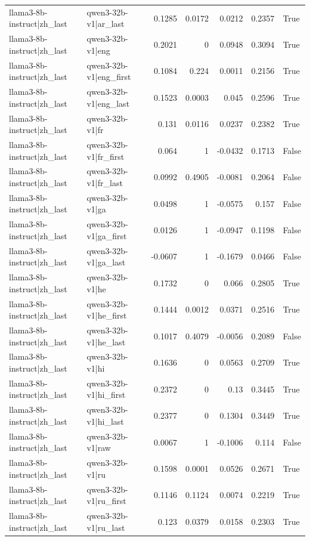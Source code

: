 \begin{table}
\begin{tabular}{l l r r r r l}
llama3-8b-instruct|zh_last & qwen3-32b-v1|ar_last & 0.1285 & 0.0172 & 0.0212 & 0.2357 & True \\
llama3-8b-instruct|zh_last & qwen3-32b-v1|eng & 0.2021 & 0 & 0.0948 & 0.3094 & True \\
llama3-8b-instruct|zh_last & qwen3-32b-v1|eng_first & 0.1084 & 0.224 & 0.0011 & 0.2156 & True \\
llama3-8b-instruct|zh_last & qwen3-32b-v1|eng_last & 0.1523 & 0.0003 & 0.045 & 0.2596 & True \\
llama3-8b-instruct|zh_last & qwen3-32b-v1|fr & 0.131 & 0.0116 & 0.0237 & 0.2382 & True \\
llama3-8b-instruct|zh_last & qwen3-32b-v1|fr_first & 0.064 & 1 & -0.0432 & 0.1713 & False \\
llama3-8b-instruct|zh_last & qwen3-32b-v1|fr_last & 0.0992 & 0.4905 & -0.0081 & 0.2064 & False \\
llama3-8b-instruct|zh_last & qwen3-32b-v1|ga & 0.0498 & 1 & -0.0575 & 0.157 & False \\
llama3-8b-instruct|zh_last & qwen3-32b-v1|ga_first & 0.0126 & 1 & -0.0947 & 0.1198 & False \\
llama3-8b-instruct|zh_last & qwen3-32b-v1|ga_last & -0.0607 & 1 & -0.1679 & 0.0466 & False \\
llama3-8b-instruct|zh_last & qwen3-32b-v1|he & 0.1732 & 0 & 0.066 & 0.2805 & True \\
llama3-8b-instruct|zh_last & qwen3-32b-v1|he_first & 0.1444 & 0.0012 & 0.0371 & 0.2516 & True \\
llama3-8b-instruct|zh_last & qwen3-32b-v1|he_last & 0.1017 & 0.4079 & -0.0056 & 0.2089 & False \\
llama3-8b-instruct|zh_last & qwen3-32b-v1|hi & 0.1636 & 0 & 0.0563 & 0.2709 & True \\
llama3-8b-instruct|zh_last & qwen3-32b-v1|hi_first & 0.2372 & 0 & 0.13 & 0.3445 & True \\
llama3-8b-instruct|zh_last & qwen3-32b-v1|hi_last & 0.2377 & 0 & 0.1304 & 0.3449 & True \\
llama3-8b-instruct|zh_last & qwen3-32b-v1|raw & 0.0067 & 1 & -0.1006 & 0.114 & False \\
llama3-8b-instruct|zh_last & qwen3-32b-v1|ru & 0.1598 & 0.0001 & 0.0526 & 0.2671 & True \\
llama3-8b-instruct|zh_last & qwen3-32b-v1|ru_first & 0.1146 & 0.1124 & 0.0074 & 0.2219 & True \\
llama3-8b-instruct|zh_last & qwen3-32b-v1|ru_last & 0.123 & 0.0379 & 0.0158 & 0.2303 & True \\

\end{tabular}
\end{table}
